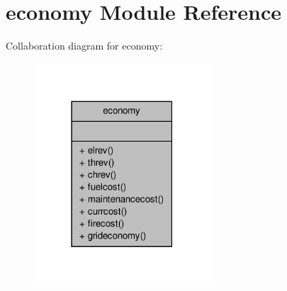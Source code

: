 \hypertarget{classeconomy}{\section{economy Module Reference}
\label{classeconomy}
}


Collaboration diagram for economy\-:\nopagebreak
\begin{figure}[H]
\begin{center}
\leavevmode
\includegraphics[width=186pt]{classeconomy__coll__graph}
\end{center}
\end{figure}
